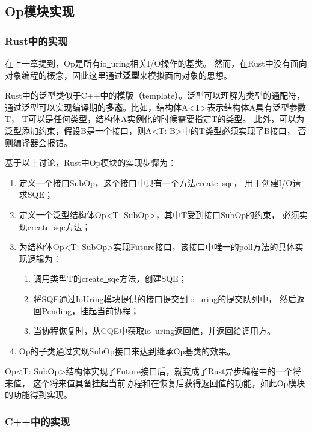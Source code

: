 \documentclass[supercite]{HustGraduPaper}
\theoremstyle{definition}
\begin{document}
\subsection{Op模块实现}
\subsubsection{Rust中的实现}
在上一章提到，Op是所有io\underline{~}uring相关I/O操作的基类。
然而，在Rust中没有面向对象编程的概念，因此这里通过\textbf{泛型}\cite{milanesi2022defining}来模拟面向对象的思想。\par

Rust中的泛型类似于C++中的模版（template）。泛型可以理解为类型的通配符，
通过泛型可以实现编译期的\textbf{多态}\cite{mills2021visual}。比如，结构体A<T>表示结构体A具有泛型参数T，
T可以是任何类型，结构体A实例化的时候需要指定T的类型。
此外，可以为泛型添加约束，假设B是一个接口，则A<T: B>中的T类型必须实现了B接口，
否则编译器会报错。\par

基于以上讨论，Rust中Op模块的实现步骤为：

\begin{enumerate}[label={(\arabic*)}]
  \item 定义一个接口SubOp，这个接口中只有一个方法create\underline{~}sqe，
    用于创建I/O请求SQE；
  \item 定义一个泛型结构体Op<T: SubOp>，其中T受到接口SubOp的约束，
    必须实现create\underline{~}sqe方法；
  \item 为结构体Op<T: SubOp>实现Future接口，该接口中唯一的poll方法的具体实现逻辑为：
    \begin{enumerate}
      \item 调用类型T的create\underline{~}sqe方法，创建SQE；
      \item 将SQE通过IoUring模块提供的接口提交到io\underline{~}uring的提交队列中，
        然后返回Pending，挂起当前协程；
      \item 当协程恢复时，从CQE中获取io\underline{~}uring返回值，并返回给调用方。
    \end{enumerate}
  \item Op的子类通过实现SubOp接口来达到继承Op基类的效果。
\end{enumerate}

Op<T: SubOp>结构体实现了Future接口后，就变成了Rust异步编程中的一个将来值，
这个将来值具备挂起当前协程和在恢复后获得返回值的功能，如此Op模块的功能得到实现。\par

\subsubsection{C++中的实现}
\end{document}
